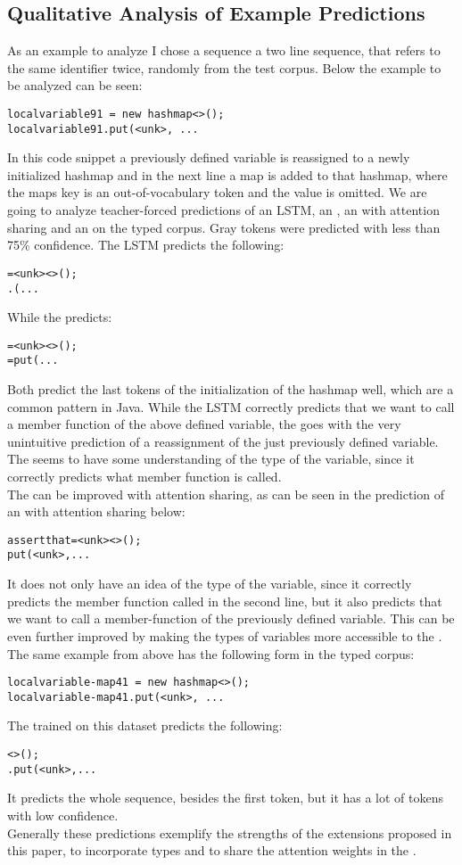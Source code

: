 \documentclass[11pt]{article}
\begin{document}
\subsection{Qualitative Analysis of Example Predictions}
As an example to analyze I chose a sequence a two line sequence, that refers to the same identifier twice, randomly from the test corpus.
Below the example to be analyzed can be seen:
\begin{verbatim}
localvariable91 = new hashmap<>();
localvariable91.put(<unk>, ...
\end{verbatim}
In this code snippet a previously defined variable is reassigned to a newly initialized hashmap and in the next line a map is added to that hashmap, where the maps key is an out-of-vocabulary token and the value is omitted.
We are going to analyze teacher-forced predictions of an LSTM, an \spn, an \spn with attention sharing and an \spn on the typed corpus. Gray tokens were predicted with less than 75\% confidence.
The LSTM predicts the following:
\begin{alltt}
 =  <unk><>();
.( ...
\end{alltt}
 While the \spn predicts:
\begin{alltt}
 =  <unk><>();
 = put( ...
\end{alltt}
Both predict the last tokens of the initialization of the hashmap well, which are a common pattern in Java. While the LSTM correctly predicts that we want to call a member function of the above defined variable, the \spn goes with the very unintuitive prediction of a reassignment of the just previously defined variable. The \spn seems to have some understanding of the type of the variable, since it correctly predicts what member function is called.\\
The \spn can be improved with attention sharing, as can be seen in the prediction of an \spn with attention sharing below:
\begin{alltt}
assertthat =  <unk><>();
put(<unk>, ...
\end{alltt}
It does not only have an idea of the type of the variable, since it correctly predicts the member function called in the second line, but it also predicts that we want to call a member-function of the previously defined variable.
This can be even further improved by making the types of variables more accessible to the \spn. The same example from above has the following form in the typed corpus:
\begin{verbatim}
localvariable-map41 = new hashmap<>();
localvariable-map41.put(<unk>, ...
\end{verbatim}
The \spn trained on this dataset predicts the following:
\begin{alltt}
<>();
.put(<unk>, ...
\end{alltt}
It predicts the whole sequence, besides the first token, but it has a lot of tokens with low confidence.\\
Generally these predictions exemplify the strengths of the extensions proposed in this paper, to incorporate types and to share the attention weights in the \spn. 
\end{document}
